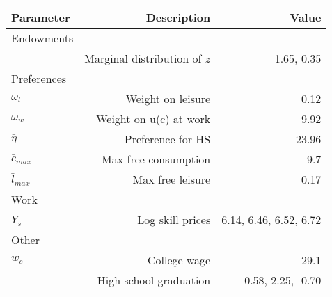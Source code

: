 \begin{tabular}{lrr}
\hline
Parameter & Description  & Value  \\ 
\hline
Endowments &   &   \\ 
 & Marginal distribution of $z$  & 1.65, 0.35  \\ 
Preferences &   &   \\ 
$\omega_{l}$ & Weight on leisure  & 0.12  \\ 
$\omega_{w}$ & Weight on u(c) at work  & 9.92  \\ 
$\bar{\eta}$ & Preference for HS  & 23.96  \\ 
$\bar{c}_{max}$ & Max free consumption  & 9.7  \\ 
$\bar{l}_{max}$ & Max free leisure  & 0.17  \\ 
Work &   &   \\ 
$\bar{Y}_{s}$ & Log skill prices  & 6.14, 6.46, 6.52, 6.72  \\ 
Other &   &   \\ 
$w_{c}$ & College wage  & 29.1  \\ 
 & High school graduation  & 0.58, 2.25, -0.70  \\ 
\hline
\end{tabular}%
